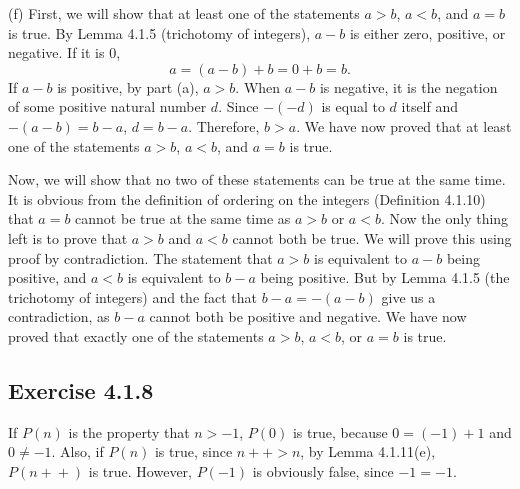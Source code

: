 \documentclass[12pt, oneside]{book}
\newcommand{\increment}{\! + \! +}
\begin{document}
	\bigskip
	\noindent (f) First, we will show that at least one of the statements $a > b$, $a < b$, and $a = b$ is true. By Lemma 4.1.5 (trichotomy of integers), $a - b$ is either zero, positive, or negative. If it is $0$, \[a = (a - b) + b = 0 + b = b.\] If $a - b$ is positive, by part (a), $a > b$. When $a - b$ is negative, it is the negation of some positive natural number $d$. Since $-(-d)$ is equal to $d$ itself and $-(a - b) = b - a$, $d = b - a$. Therefore, $b > a$. We have now proved that at least one of the statements $a > b$, $a < b$, and $a = b$ is true.
	
	Now, we will show that no two of these statements can be true at the same time. It is obvious from the definition of ordering on the integers (Definition 4.1.10) that $a = b$ cannot be true at the same time as $a > b$ or $a < b$. Now the only thing left is to prove that $a > b$ and $a < b$ cannot both be true. We will prove this using proof by contradiction. The statement that $a > b$ is equivalent to $a - b$ being positive, and $a < b$ is equivalent to $b - a$ being positive. But by Lemma 4.1.5 (the trichotomy of integers) and the fact that $b - a = -(a - b)$ give us a contradiction, as $b - a$ cannot both be positive and negative. We have now proved that exactly one of the statements $a > b$, $a < b$, or $a = b$ is true.
	
	\subsection*{Exercise 4.1.8}
	
	If $P(n)$ is the property that $n > -1$, $P(0)$ is true, because $0 = (-1) + 1$ and $0 \ne -1$. Also, if $P(n)$ is true, since $n \increment > n$, by Lemma 4.1.11(e), $P(n \increment)$ is true. However, $P(-1)$ is obviously false, since $-1 = -1$.
	
\end{document}

